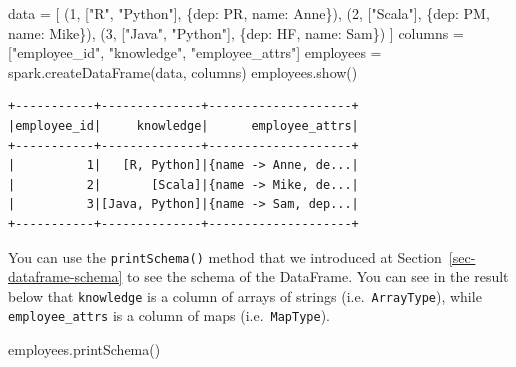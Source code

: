 \documentclass[
  11pt,
  letterpaper,
  DIV=11,
  numbers=noendperiod]{scrreprt}
\newenvironment{Shaded}{\begin{snugshade}}{\end{snugshade}}
\newcommand{\DecValTok}[1]{\textcolor[rgb]{0.68,0.00,0.00}{#1}}
\newcommand{\NormalTok}[1]{\textcolor[rgb]{0.00,0.23,0.31}{#1}}
\newcommand{\OperatorTok}[1]{\textcolor[rgb]{0.37,0.37,0.37}{#1}}
\newcommand{\StringTok}[1]{\textcolor[rgb]{0.13,0.47,0.30}{#1}}
\begin{document}
\begin{Shaded}
\begin{Highlighting}[]
\NormalTok{data }\OperatorTok{=}\NormalTok{ [}
\NormalTok{    (}\DecValTok{1}\NormalTok{, [}\StringTok{"R"}\NormalTok{, }\StringTok{"Python"}\NormalTok{], \{}\StringTok{\textquotesingle{}dep\textquotesingle{}}\NormalTok{: }\StringTok{\textquotesingle{}PR\textquotesingle{}}\NormalTok{, }\StringTok{\textquotesingle{}name\textquotesingle{}}\NormalTok{: }\StringTok{\textquotesingle{}Anne\textquotesingle{}}\NormalTok{\}),}
\NormalTok{    (}\DecValTok{2}\NormalTok{, [}\StringTok{"Scala"}\NormalTok{], \{}\StringTok{\textquotesingle{}dep\textquotesingle{}}\NormalTok{: }\StringTok{\textquotesingle{}PM\textquotesingle{}}\NormalTok{, }\StringTok{\textquotesingle{}name\textquotesingle{}}\NormalTok{: }\StringTok{\textquotesingle{}Mike\textquotesingle{}}\NormalTok{\}),}
\NormalTok{    (}\DecValTok{3}\NormalTok{, [}\StringTok{"Java"}\NormalTok{, }\StringTok{"Python"}\NormalTok{], \{}\StringTok{\textquotesingle{}dep\textquotesingle{}}\NormalTok{: }\StringTok{\textquotesingle{}HF\textquotesingle{}}\NormalTok{, }\StringTok{\textquotesingle{}name\textquotesingle{}}\NormalTok{: }\StringTok{\textquotesingle{}Sam\textquotesingle{}}\NormalTok{\})}
\NormalTok{]}
\NormalTok{columns }\OperatorTok{=}\NormalTok{ [}\StringTok{"employee\_id"}\NormalTok{, }\StringTok{"knowledge"}\NormalTok{, }\StringTok{"employee\_attrs"}\NormalTok{]}
\NormalTok{employees }\OperatorTok{=}\NormalTok{ spark.createDataFrame(data, columns)}
\NormalTok{employees.show()}
\end{Highlighting}
\end{Shaded}

\begin{verbatim}
+-----------+--------------+--------------------+
|employee_id|     knowledge|      employee_attrs|
+-----------+--------------+--------------------+
|          1|   [R, Python]|{name -> Anne, de...|
|          2|       [Scala]|{name -> Mike, de...|
|          3|[Java, Python]|{name -> Sam, dep...|
+-----------+--------------+--------------------+
\end{verbatim}

You can use the \texttt{printSchema()} method that we introduced at
Section~\ref{sec-dataframe-schema} to see the schema of the DataFrame.
You can see in the result below that \texttt{knowledge} is a column of
arrays of strings (i.e.~\texttt{ArrayType}), while
\texttt{employee\_attrs} is a column of maps (i.e.~\texttt{MapType}).

\begin{Shaded}
\begin{Highlighting}[]
\NormalTok{employees.printSchema()}
\end{Highlighting}
\end{Shaded}
\end{document}
